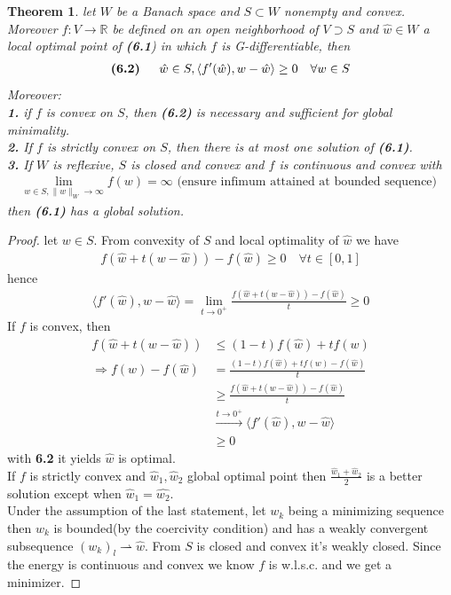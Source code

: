 \documentclass[a4paper,11pt,fleqn]{book}
\newtheorem{theorem}{Theorem}[section]
\theoremstyle{definition}
\theoremstyle{remark}
\begin{document}
\begin{theorem}
	let $W$ be a Banach space and $S \subset W$ nonempty and convex. Moreover $f: V \rightarrow \mathbb{R}$ be defined on an open neighborhood of $ V \supset S$ and $\hat{w} \in W$ a local optimal point of \textbf{(6.1}) in which $f$ is G-differentiable, then
	\begin{align*}
	\textbf{(6.2) \quad}
		\hat{w} \in S, \langle f'(\hat{w}), w - \hat{w} \rangle \geq 0 \quad \forall w \in S
	\end{align*}
	Moreover:\\
	\textbf{1. }if $f$ is convex on $S$, then \textbf{(6.2)} is necessary and sufficient for global minimality.\\
	\textbf{2. }If $f$ is strictly convex on $S$, then there is at most one solution of \textbf{(6.1)}. \\
	\textbf{3. }If $W$ is reflexive, $S$ is closed and convex and $f$ is continuous and convex with 
	\begin{align*}
		\lim_{w \in S, \|w\|_W \rightarrow \infty } f(w) = \infty
		\text{ (ensure infimum attained at bounded sequence) }
	\end{align*}
	then \textbf{(6.1)} has a global solution. 
\end{theorem}
\begin{proof}
	let $w \in S$. From convexity of $S$ and local optimality of $\hat{w}$  we have
	\begin{align*}
		f(\hat{w} + t(w - \hat{w})) - f(\hat{w}) \geq 0 \quad \forall t \in [0, 1]
	\end{align*}
	hence 
	\begin{align*}
		\langle f'(\hat{w}), w - \hat{w} \rangle = \lim_{t \rightarrow 0^+}
		\frac{f(\hat{w} + t(w - \hat{w})) - f(\hat{w}) }{t} \geq0
	\end{align*}
	If $f$ is convex, then
	\begin{align*}
		f(\hat{w} + t(w - \hat{w})) &\le (1 - t) f(\hat{w}) + t f(w)\\
		\Rightarrow
		f(w) - f(\hat{w}) &= \frac{(1 - t) f(\hat{w}) + tf(w) - f(\hat{w}) }{t}\\
		&\ge \frac{f(\hat{w} + t(w - \hat{w})) - f(\hat{w}) }{t}\\
		&\overset{t \rightarrow 0^+}{\rightarrow} \langle f'(\hat{w}), w - \hat{w} \rangle \\
		&\ge 0
	\end{align*}
	with \textbf{6.2} it yields $\hat{w}$ is optimal. \\
	If $f$ is strictly convex and $\hat{w}_1, \hat{w}_2$ global optimal point then $\frac{ \hat{w}_1 + \hat{w}_2}{2}$ is a better solution except when $\hat{w}_1 = \hat{w_2}$. \\
	Under the assumption of the last statement, let $w_k$ being a minimizing sequence then $w_k$ is bounded(by the coercivity condition) and has a weakly convergent subsequence $(w_k)_l \rightharpoonup \hat{w}$. From $S$ is closed and convex it's weakly closed. Since the energy is continuous and convex we know $f$ is w.l.s.c. and we get a minimizer. 
\end{proof}
\end{document}

